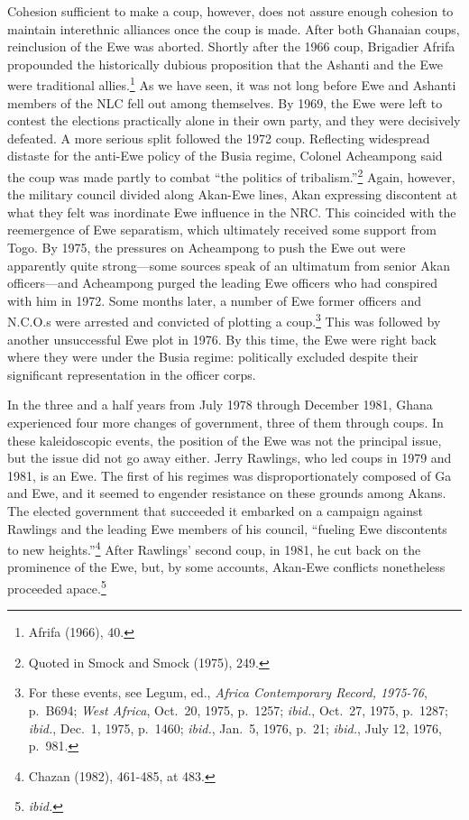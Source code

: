 \documentclass[
  letterpaper,
  DIV=11,
  numbers=noendperiod]{scrartcl}
\newcounter{none} %
\begin{document}
Cohesion sufficient to make a coup, however, does not assure enough
cohesion to maintain interethnic alliances once the coup is made. After
both Ghanaian coups, reinclusion of the Ewe was aborted. Shortly after
the 1966 coup, Brigadier Afrifa propounded the historically dubious
proposition that the Ashanti and the Ewe were traditional
allies.\footnote{Afrifa (1966), 40.} As we have seen, it was not long
before Ewe and Ashanti members of the NLC fell out among themselves. By
1969, the Ewe were left to contest the elections practically alone in
their own party, and they were decisively defeated. A more serious split
followed the 1972 coup. Reflecting widespread distaste for the anti-Ewe
policy of the Busia regime, Colonel Acheampong said the coup was made
partly to combat ``the politics of tribalism.''\footnote{Quoted in Smock
  and Smock (1975), 249.} Again, however, the military council divided
along Akan-Ewe lines, Akan expressing discontent at what they felt was
inordinate Ewe influence in the NRC. This coincided with the reemergence
of Ewe separatism, which ultimately received some support from Togo. By
1975, the pressures on Acheampong to push the Ewe out were apparently
quite strong---some sources speak of an ultimatum from senior Akan
officers---and Acheampong purged the leading Ewe officers who had
conspired with him in 1972. Some months later, a number of Ewe former
officers and N.C.O.s were arrested and convicted of plotting a
coup.\footnote{For these events, see Legum, ed., \emph{Africa
  Contemporary Record, 1975-76}, p.~B694; \emph{West Africa}, Oct.~20,
  1975, p.~1257; \emph{ibid.}, Oct.~27, 1975, p.~1287; \emph{ibid.},
  Dec.~1, 1975, p.~1460; \emph{ibid.}, Jan.~5, 1976, p.~21;
  \emph{ibid.}, July 12, 1976, p.~981.} This was followed by another
unsuccessful Ewe plot in 1976. By this time, the Ewe were right back
where they were under the Busia regime: politically excluded despite
their significant representation in the officer corps.

In the three and a half years from July 1978 through December 1981,
Ghana experienced four more changes of government, three of them through
coups. In these kaleidoscopic events, the position of the Ewe was not
the principal issue, but the issue did not go away either. Jerry
Rawlings, who led coups in 1979 and 1981, is an Ewe. The first of his
regimes was disproportionately composed of Ga and Ewe, and it seemed to
engender resistance on these grounds among Akans. The elected government
that succeeded it embarked on a campaign against Rawlings and the
leading Ewe members of his council, ``fueling Ewe discontents to new
heights.''\footnote{Chazan (1982), 461-485, at 483.} After Rawlings'
second coup, in 1981, he cut back on the prominence of the Ewe, but, by
some accounts, Akan-Ewe conflicts nonetheless proceeded
apace.\footnote{\emph{ibid.}}
\end{document}
